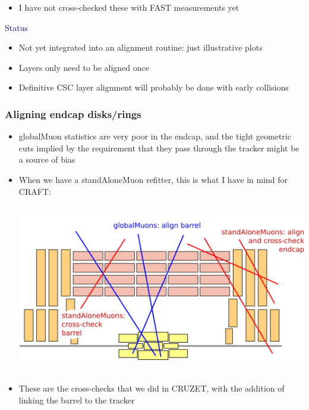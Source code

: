 \documentclass[compress]{beamer}
\begin{document}
\begin{frame}
\vspace{0.1 cm}
\hspace{-0.45 cm} \begin{minipage}{0.9\linewidth}
\begin{itemize}
\item I have not cross-checked these with FAST measurements yet
\end{itemize}
\end{minipage}

\vspace{0.3 cm}
\hspace{-0.83 cm} \textcolor{darkblue}{\Large Status}

\begin{itemize}
\item Not yet integrated into an alignment routine: just illustrative plots
\item Layers only need to be aligned once
\item Definitive CSC layer alignment will probably be done with early \mbox{collisions\hspace{-1 cm}}
\end{itemize}
\end{frame}

\begin{frame}
\frametitle{Aligning endcap disks/rings}

\begin{itemize}
\item globalMuon statistics are very poor in the endcap, and the tight
  geometric cuts implied by the requirement that they pass through the
  tracker might be a source of bias

\item When we have a standAloneMuon refitter, this is what I have in mind for CRAFT:

\mbox{ } \hfill \includegraphics[width=0.9\linewidth]{globalMuons_and_standAloneMuons.png} \hfill \mbox{ }

\item These are the cross-checks that we did in CRUZET, with the addition of linking the barrel to the tracker
\end{itemize}
\end{frame}
\end{document}
